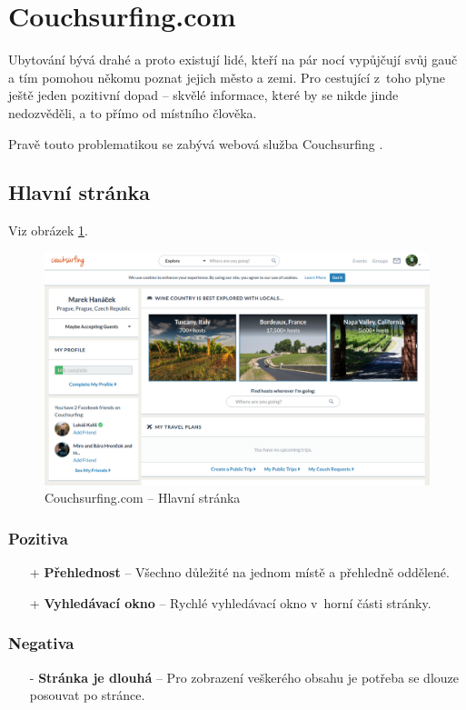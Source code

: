 \section{Couchsurfing.com}
\label{analyza:couchsurfing}

Ubytování bývá drahé a proto existují lidé, kteří na pár nocí vypůjčují svůj gauč a tím pomohou někomu poznat jejich město a zemi. Pro cestující z~toho plyne ještě jeden pozitivní dopad -- skvělé informace, které by se nikde jinde nedozvěděli, a to přímo od místního člověka.

Pravě touto problematikou se zabývá webová služba Couchsurfing \cite{couchsurfing}.
\subsection{Hlavní stránka}
Viz obrázek \ref{fig:couchsurfing:homepage}.
\begin{figure}[h]
    \centering
    \includegraphics[width=1.0\textwidth]{media/couchsurfing/homepage.png}
    \caption{Couchsurfing.com -- Hlavní stránka}
    \label{fig:couchsurfing:homepage}
\end{figure}
\subsubsection*{Pozitiva}
\begin{itemize}
    \item[+] \textbf{Přehlednost} -- Všechno důležité na jednom místě a přehledně oddělené.
    \item[+] \textbf{Vyhledávací okno} -- Rychlé vyhledávací okno v~horní části stránky.
\end{itemize}
\subsubsection*{Negativa}
\begin{itemize}
    \item[-] \textbf{Stránka je dlouhá} -- Pro zobrazení veškerého obsahu je potřeba se dlouze posouvat po stránce.
\end{itemize}


